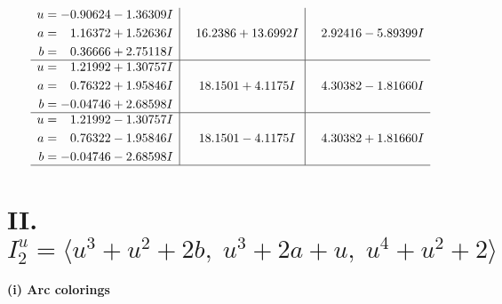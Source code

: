 \documentclass[1p]{elsarticle_modified}
\theoremstyle{definition}
\begin{document}
$$\begin{array}{c|c|c}
\begin{aligned}
u &= -0.90624 - 1.36309 I \\
a &= \phantom{-}1.16372 + 1.52636 I \\
b &= \phantom{-}0.36666 + 2.75118 I\end{aligned}
 & \phantom{-}16.2386 + 13.6992 I & \phantom{-}2.92416 - 5.89399 I \\ \hline\begin{aligned}
u &= \phantom{-}1.21992 + 1.30757 I \\
a &= \phantom{-}0.76322 + 1.95846 I \\
b &= -0.04746 + 2.68598 I\end{aligned}
 & \phantom{-}18.1501 + 4.1175 I & \phantom{-}4.30382 - 1.81660 I \\ \hline\begin{aligned}
u &= \phantom{-}1.21992 - 1.30757 I \\
a &= \phantom{-}0.76322 - 1.95846 I \\
b &= -0.04746 - 2.68598 I\end{aligned}
 & \phantom{-}18.1501 - 4.1175 I & \phantom{-}4.30382 + 1.81660 I\\
 \hline 
 \end{array}$$\newpage\newpage\renewcommand{\arraystretch}{1}
\centering \section*{II. $I^u_{2}= \langle u^3+u^2+2 b,\;u^3+2 a+u,\;u^4+u^2+2 \rangle$}
\flushleft \textbf{(i) Arc colorings}\\
\end{document}
